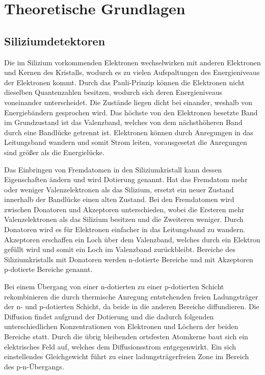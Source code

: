 \chapter{Theoretische Grundlagen}


\section{Siliziumdetektoren}

Die im Silizium vorkommenden Elektronen wechselwirken mit anderen Elektronen und
Kernen des Kristalls, wodurch es zu vielen Aufspaltungen des Energieniveaus der Elektronen kommt. Durch das Pauli-Prinzip können
die Elektronen nicht dieselben Quantenzahlen besitzen, wodurch sich deren Energieniveaus voneinander unterscheidet.
Die Zustände liegen dicht bei einander, weshalb von Energiebändern gesprochen wird.
Das höchste von den Elektronen besetzte Band im Grundzustand ist das Valenzband, welches von dem
nächsthöheren Band durch eine Bandlücke getrennt ist. Elektronen können
durch Anregungen in das Leitungsband wandern und somit Strom leiten, vorausgesetzt
die Anregungen sind größer als die Energielücke.

Das Einbringen von Fremdatomen in den Siliziumkristall kann dessen Eigenschaften ändern
und wird Dotierung genannt.
Hat das Fremdatom mehr oder weniger Valenzelektronen als das Silizium, ersetzt ein neuer Zustand innerhalb der Bandlücke
einen alten Zustand.
Bei den Fremdatomen wird zwischen Donatoren und Akzeptoren unterschieden, wobei die
Ersteren mehr Valenzelektronen als das Silizium besitzen und die Zweiteren weniger.
Durch Donatoren wird es für Elektronen einfacher in das Leitungsband zu wandern. Akzeptoren
erschaffen ein Loch über dem Valenzband, welches durch ein Elektron gefüllt wird und somit ein
Loch im Valenzband zurückbleibt.
Bereiche des Siliziumkristalls mit Donatoren werden n-dotierte Bereiche
und mit Akzeptoren p-dotierte Bereiche genannt.

Bei einem Übergang von einer n-dotierten zu einer p-dotierten Schicht rekombinieren die durch
thermische Anregung entstehenden freien Ladungsträger
der n- und p-dotierten Schicht, da beide
in die anderen Bereiche diffundieren. Die Diffusion findet aufgrund der Dotierung und die dadurch folgenden unterschiedlichen
Konzentrationen von Elektronen und Löchern der beiden Bereiche statt.
Durch die übrig bleibenden ortsfesten Atomkerne
baut sich ein elektrisches Feld auf, welches dem Diffusionsstrom entgegenwirkt.
Ein sich einstellendes Gleichgewicht führt zu einer ladungsträgerfreien Zone
im Bereich des p-n-Übergangs.

